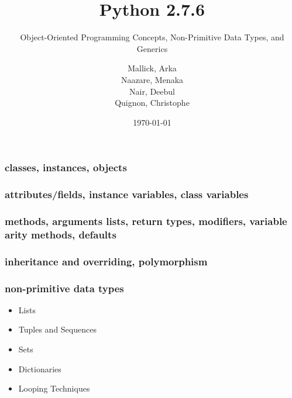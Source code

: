 \documentclass{beamer}
\begin{document}
\title{Python 2.7.6}
\subtitle{Object-Oriented Programming Concepts, Non-Primitive Data Types, and Generics}
\author{
  Mallick, Arka\\
  Naazare, Menaka \\
  Nair, Deebul\\
  Quignon, Christophe \\
} 
\date{\today}

\begin{frame}
\titlepage
\end{frame}

\begin{frame}[fragile]
\frametitle{classes, instances, objects}
\framesubtitle{}

\end{frame}

\begin{frame}[fragile]
\frametitle{attributes/fields, instance variables, class variables}
\framesubtitle{}

\end{frame}

\begin{frame}[fragile]
\frametitle{methods, arguments lists, return types, modifiers, variable arity methods, defaults}
\framesubtitle{}

\end{frame}

\begin{frame}[fragile]
\frametitle{inheritance and overriding, polymorphism}
\framesubtitle{}

\end{frame}

\begin{frame}[fragile]
\frametitle{non-primitive data types}
\begin{itemize}
	\item Lists
	\item Tuples and Sequences
	\item Sets
	\item Dictionaries
	\item Looping Techniques
\end{itemize}
\framesubtitle{}

\end{frame}
\end{document}
